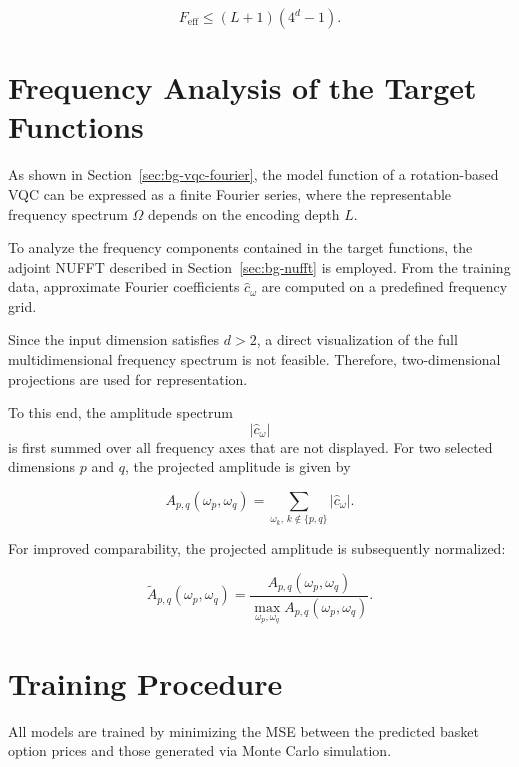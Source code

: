 \begin{equation}
F_{\text{eff}} \le (L+1)(4^d - 1).
\end{equation}

\section{Frequency Analysis of the Target Functions}
\label{sec:mt-frequency-analysis}

As shown in Section~\ref{sec:bg-vqc-fourier}, the model function of a rotation-based VQC can be expressed as a finite Fourier series, where the representable frequency spectrum $\Omega$ depends on the encoding depth $L$.

To analyze the frequency components contained in the target functions, the adjoint NUFFT described in Section~\ref{sec:bg-nufft} is employed.
From the training data, approximate Fourier coefficients $\hat{c}_\omega$ are computed on a predefined frequency grid.

Since the input dimension satisfies $d > 2$, a direct visualization of the full multidimensional frequency spectrum is not feasible.
Therefore, two-dimensional projections are used for representation.

To this end, the amplitude spectrum
\[
|\hat{c}_\omega|
\]
is first summed over all frequency axes that are not displayed.
For two selected dimensions $p$ and $q$, the projected amplitude is given by

\begin{equation}
A_{p,q}(\omega_p, \omega_q)
=
\sum_{\omega_k,\, k \notin \{p,q\}}
|\hat{c}_\omega|.
\end{equation}

For improved comparability, the projected amplitude is subsequently normalized:

\begin{equation}
\widetilde{A}_{p,q}(\omega_p, \omega_q)
=
\frac{
A_{p,q}(\omega_p, \omega_q)
}{
\max_{\omega_p,\omega_q}
A_{p,q}(\omega_p, \omega_q)
}.
\end{equation}

\section{Training Procedure}
\label{sec:mt-training}

All models are trained by minimizing the MSE between the predicted basket option prices and those generated via Monte Carlo simulation.

